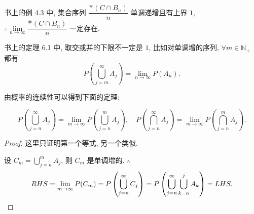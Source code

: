 \documentclass{ctexart}
\begin{document}
书上的例 4.3 中, 集合序列 $\dfrac{^\#(C\cap B_n)}{n}$ 单调递增且有上界 $1$, $\therefore\lim\limits_{n\to\infty}\dfrac{^\#(C\cap B_n)}{n}$ 一定存在.

书上的定理 6.1 中, 取交或并的下限不一定是 $1$, 比如对单调增的序列, $\forall m\in\mathbb{N}_+$ 都有
\[P\left(\bigcup\limits_{j=m}^\infty A_j\right)=\lim\limits_{n\to\infty}P(A_n).\]

由概率的连续性可以得到下面的定理:
\begin{theorem}\label{t1.3}
    \[P\left(\bigcup\limits_{j=n}^\infty A_j\right)=\lim\limits_{m\to\infty}P\left(\bigcup\limits_{j=n}^mA_j\right),\quad P\left(\bigcap\limits_{j=n}^\infty A_j\right)=\lim\limits_{m\to\infty}P\left(\bigcap\limits_{j=n}^mA_j\right).\]
\end{theorem}
\begin{proof}
    这里只证明第一个等式, 另一个类似.

    设 $C_m=\bigcup\limits_{j=n}^mA_j$, 则 $C_m$ 是单调增的. $\therefore$
    \[RHS=\lim\limits_{m\to\infty}P(C_m)=P\left(\bigcup\limits_{j=n}^\infty C_j\right)=P\left(\bigcup\limits_{j=n}^\infty\bigcup\limits_{k=n}^jA_k\right)=LHS.\qedhere\]
\end{proof}
\end{document}
